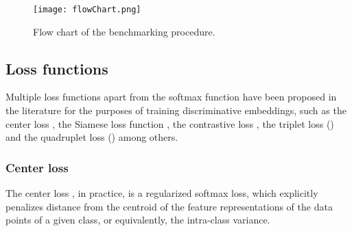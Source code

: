 \documentclass[10pt,twocolumn,letterpaper]{article}
\begin{document}
            \begin{figure*}[!t]
                \begin{center} \texttt{[image: flowChart.png]}
                    \caption{Flow chart of the benchmarking procedure.}
                    \label{fig:flow}
                \end{center}
            \end{figure*}
    \subsection{Loss functions \label{sec:related_work:loss_fns}}
        Multiple loss functions apart from the softmax function have been proposed in the literature for the purposes of training discriminative embeddings, such as the center loss \cite{Wen2016}, the Siamese loss function \cite{chopra2005learning}, the contrastive loss \cite{hadsell2006dimensionality}, the triplet loss (\cite{SchroffEtAl15}) and the quadruplet loss (\cite{chen2017beyond}) among others.

        \subsubsection{Center loss \label{sec:related_work:loss_fns:center_loss}}
            The center loss \cite{Wen2016}, in practice, is a regularized softmax loss, which explicitly penalizes distance from the centroid of the feature representations of the data points of a given class, or equivalently, the intra-class variance.

\end{document}
